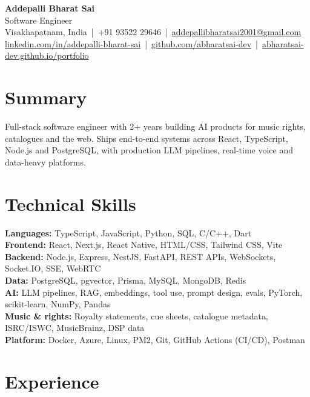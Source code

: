 \documentclass[10pt,a4paper]{article}
\begin{document}
\begin{center}
  {\LARGE\bfseries Addepalli Bharat Sai}\\[2pt]
  {\large Software Engineer}\\[2pt]
  {\small
    Visakhapatnam, India \,|\, +91 93522 29646 \,|\, \href{mailto:addepallibharatsai2001@gmail.com}{addepallibharatsai2001@gmail.com}\\[1pt]
    \href{https://www.linkedin.com/in/addepalli-bharat-sai-89b376193/}{linkedin.com/in/addepalli-bharat-sai} \,|\, \href{https://github.com/abharatsai-dev}{github.com/abharatsai-dev} \,|\, \href{https://abharatsai-dev.github.io/portfolio/}{abharatsai-dev.github.io/portfolio}
  }
\end{center}

\section*{Summary}
\small Full-stack software engineer with 2+ years building AI products for music rights, catalogues and the web. Ships end-to-end systems across React, TypeScript, Node.js and PostgreSQL, with production LLM pipelines, real-time voice and data-heavy platforms.

\section*{Technical Skills}
{\small
\textbf{Languages:} TypeScript, JavaScript, Python, SQL, C/C++, Dart\\[1pt]
\textbf{Frontend:} React, Next.js, React Native, HTML/CSS, Tailwind CSS, Vite\\[1pt]
\textbf{Backend:} Node.js, Express, NestJS, FastAPI, REST APIs, WebSockets, Socket.IO, SSE, WebRTC\\[1pt]
\textbf{Data:} PostgreSQL, pgvector, Prisma, MySQL, MongoDB, Redis\\[1pt]
\textbf{AI:} LLM pipelines, RAG, embeddings, tool use, prompt design, evals, PyTorch, scikit-learn, NumPy, Pandas\\[1pt]
\textbf{Music \& rights:} Royalty statements, cue sheets, catalogue metadata, ISRC/ISWC, MusicBrainz, DSP data\\[1pt]
\textbf{Platform:} Docker, Azure, Linux, PM2, Git, GitHub Actions (CI/CD), Postman
}

\section*{Experience}
\end{document}
